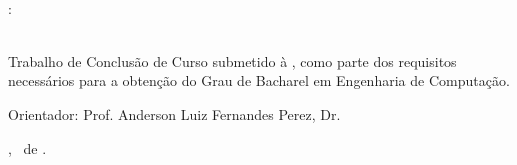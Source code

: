 \documentclass{ufscThesis} %
\begin{document}
\capa  

\begin{titlepage}
	\vfill
	\begin{center}
		\ABNTautordata \\[5cm]
		
		\tituloformat{\ABNTtitulodata}: \\
		\tituloformat{\subtitulodata} \\[1cm]
		
		\hspace{.45\textwidth} %
		\begin{minipage}{.5\textwidth}
			\begin{espacosimples}
				
				Trabalho de Conclusão de Curso submetido à \ABNTinstituicaodata,
				como parte dos requisitos necessários para a obtenção do Grau de
				Bacharel em Engenharia de Computação.
				
				Orientador: Prof. Anderson Luiz Fernandes Perez, Dr.
			\end{espacosimples}
		\end{minipage}
		\vfill \localformat \ABNTlocaldata, \mesdata\ de \anodata.
	\end{center}
	\vspace{1cm}
\end{titlepage}

\paginaresumo
\listadefiguras %
\listadetabelas 
\listadeabreviaturas
\sumario








\end{document}
